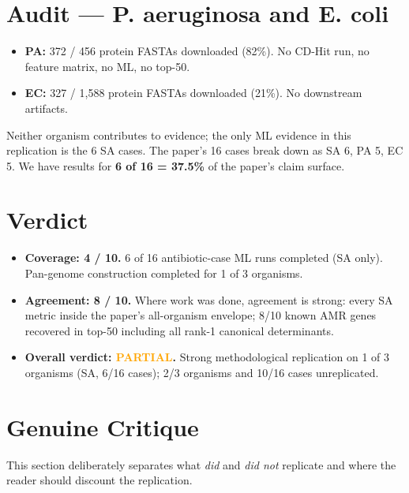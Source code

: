 \documentclass[11pt]{article}
\begin{document}
\section{Audit --- P. aeruginosa and E. coli}
\begin{itemize}
  \item \textbf{PA:} 372 / 456 protein FASTAs downloaded (82\%). No CD-Hit run, no feature matrix, no ML, no top-50.
  \item \textbf{EC:} 327 / 1{,}588 protein FASTAs downloaded (21\%). No downstream artifacts.
\end{itemize}
Neither organism contributes to evidence; the only ML evidence in this replication is the 6 SA cases. The paper's 16 cases break down as SA 6, PA 5, EC 5. We have results for \textbf{6 of 16 = 37.5\%} of the paper's claim surface.

\section{Verdict}
\begin{itemize}
  \item \textbf{Coverage: 4 / 10.} 6 of 16 antibiotic-case ML runs completed (SA only). Pan-genome construction completed for 1 of 3 organisms.
  \item \textbf{Agreement: 8 / 10.} Where work was done, agreement is strong: every SA metric inside the paper's all-organism envelope; 8/10 known AMR genes recovered in top-50 including all rank-1 canonical determinants.
  \item \textbf{Overall verdict: \textcolor{orange}{PARTIAL}.} Strong methodological replication on 1 of 3 organisms (SA, 6/16 cases); 2/3 organisms and 10/16 cases unreplicated.
\end{itemize}

\section{Genuine Critique}

This section deliberately separates what \emph{did} and \emph{did not} replicate and where the reader should discount the replication.
\end{document}
